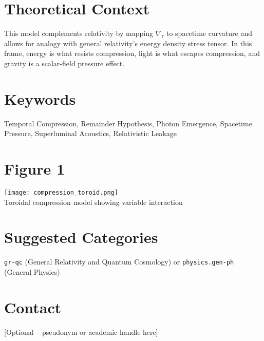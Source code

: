 \documentclass[12pt]{article}
\begin{document}
\section*{Theoretical Context}
This model complements relativity by mapping $\nabla_\tau$ to spacetime curvature and allows for analogy with general relativity's energy density stress tensor. In this frame, energy is what resists compression, light is what escapes compression, and gravity is a scalar-field pressure effect.

\section*{Keywords}
Temporal Compression, Remainder Hypothesis, Photon Emergence, Spacetime Pressure, Superluminal Acoustics, Relativistic Leakage

\section*{Figure 1}
\begin{center}
\texttt{[image: compression\_toroid.png]} \\
Toroidal compression model showing variable interaction
\end{center}

\section*{Suggested Categories}
\texttt{gr-qc} (General Relativity and Quantum Cosmology) or \texttt{physics.gen-ph} (General Physics)

\section*{Contact}
[Optional -- pseudonym or academic handle here]
\end{document}
